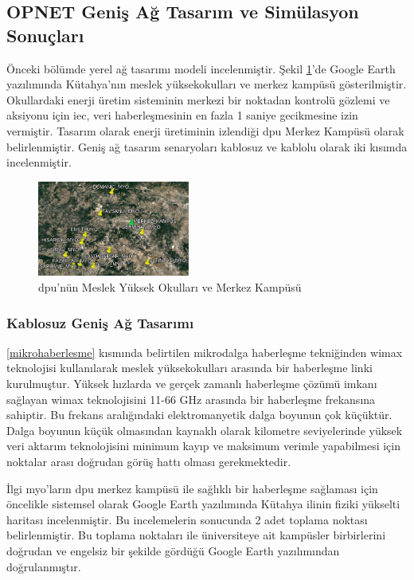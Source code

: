 \subsection{OPNET Geniş Ağ Tasarım ve Simülasyon Sonuçları}

Önceki bölümde yerel ağ tasarımı modeli incelenmiştir. Şekil \ref{fig:4-27}’de Google Earth yazılımında Kütahya’nın meslek yüksekokulları ve merkez kampüsü gösterilmiştir. Okullardaki enerji üretim sisteminin merkezi bir noktadan kontrolü gözlemi ve aksiyonu için \gls{iec}, veri haberleşmesinin en fazla 1 saniye gecikmesine izin vermiştir. Tasarım olarak enerji üretiminin izlendiği \gls{dpu} Merkez Kampüsü olarak belirlenmiştir. Geniş ağ tasarım senaryoları kablosuz ve kablolu olarak iki kısımda incelenmiştir.


\begin{figure}[htbp]
\centerline{\includegraphics[width=5cm]{Resim/sekil4-26.jpg}}
\caption{\gls{dpu}’nün Meslek Yüksek Okulları ve Merkez Kampüsü}
\label{fig:4-27}
\end{figure}


\subsubsection{Kablosuz Geniş Ağ Tasarımı}

\ref{mikrohaberlesme} kısmında belirtilen mikrodalga haberleşme tekniğinden \gls{wimax} teknolojisi kullanılarak meslek yüksekokulları arasında bir haberleşme linki kurulmuştur. Yüksek hızlarda ve gerçek zamanlı haberleşme çözümü imkanı sağlayan \gls{wimax} teknolojisini 11-66 GHz arasında bir haberleşme frekansına sahiptir. Bu frekans aralığındaki elektromanyetik dalga boyunun çok küçüktür. Dalga boyunun küçük olmasından kaynaklı olarak kilometre seviyelerinde yüksek veri aktarım teknolojisini minimum kayıp ve maksimum verimle yapabilmesi için noktalar arası doğrudan görüş hattı olması gerekmektedir.

İlgi \gls{myo}'ların \gls{dpu} merkez kampüsü ile sağlıklı bir haberleşme sağlaması için öncelikle sistemsel olarak Google Earth yazılımında Kütahya ilinin fiziki yükselti haritası incelenmiştir. Bu incelemelerin sonucunda 2 adet toplama noktası belirlenmiştir. Bu toplama noktaları ile üniversiteye ait kampüsler birbirlerini doğrudan ve engelsiz bir şekilde gördüğü Google Earth yazılımından doğrulanmıştır.

